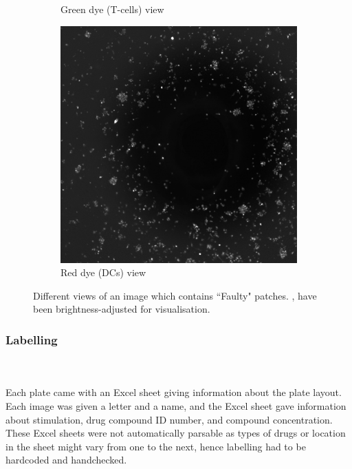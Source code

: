 \begin{figure}[h!]
\begin{subfigure}[h!]{0.3\textwidth}
        \caption{Green dye (T-cells) view}
        \label{subfig:tcell}
    \end{subfigure}
    \begin{subfigure}[h!]{0.3\textwidth}
        \includegraphics[width=\textwidth]{dissertation/figures/faulty_dcell.jpg}
        \caption{Red dye (DCs) view}
        \label{subfig:dc}
    \end{subfigure}
    \caption{Different views of an image which contains ``Faulty" patches. \protect{}, \protect{} have been brightness-adjusted for visualisation.}
    \label{fig:noisyimage}
\end{figure}

\bigskip
\subsubsection{Labelling}

\hfill\\
\hfill\\
Each plate came with an Excel sheet giving information about the plate layout. Each image was given a letter and a name, and the Excel sheet gave information about stimulation, drug compound ID number, and compound concentration. These Excel sheets were not automatically parsable as types of drugs or location in the sheet might vary from one to the next, hence labelling had to be hardcoded and handchecked.

